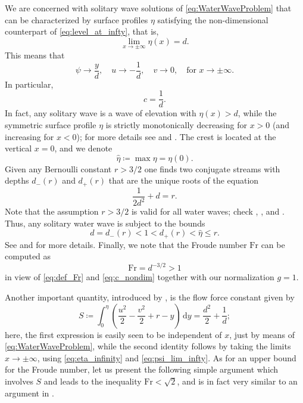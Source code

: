 \documentclass{amsart}
\theoremstyle{definition}
\newcommand{\dd}{\mathrm d}
\newcommand{\Fr}{\textrm{Fr}}
\begin{document}
We are concerned with solitary wave solutions of \eqref{eq:WaterWaveProblem} that can be characterized by surface profiles $\eta$ satisfying the non-dimensional counterpart of \eqref{eq:level_at_infty}, that is,
\begin{equation}\label{eq:eta_infinity}
	\lim_{x\to\pm\infty}\eta(x)=d.
\end{equation}
This means that
\begin{equation}\label{eq:psi_lim_infty}
	\psi\to\frac yd,\quad u\to-\frac1d,\quad v\to 0,\quad \textrm{for }x\to\pm\infty.
\end{equation}
In particular,
\begin{equation}\label{eq:c_nondim}
	c=\frac1d.
\end{equation}
In fact, any solitary wave is a wave of elevation with $\eta(x) > d$, while the symmetric surface profile $\eta$ is strictly monotonically decreasing for $x > 0$ (and increasing for $x<0$); for more details see \cite{CraigSternberg88} and \cite{KozlovLokharuWheeler21}. The crest is located at the vertical $x = 0$, and we denote
\[\hat\eta \coloneqq \max \eta = \eta(0).\]
Given any Bernoulli constant $r > 3/2$ one finds two conjugate streams with depths $d_-(r)$ and $d_+(r)$ that are the unique roots of the equation
\begin{equation}\label{eq:d}
	\frac{1}{2d^2} + d = r.
\end{equation}
Note that the assumption $r > 3/2$ is valid for all water waves; check \cite{AmickToland81b}, \cite{KeadyNorbury75}, and \cite{Kozlov2009-xp}. Thus, any solitary water wave is subject to the bounds
\begin{equation}\label{eq:hateta_interval}
	d = d_-(r) < 1 < d_+(r) < \hat{\eta} \leq r.
\end{equation}
See \cite{KeadyNorbury75} and \cite{Kozlov2009-xp} for more details. Finally, we note that the Froude number $\Fr$ can be computed as
\begin{equation}\label{eq:Fr_nondim}
	\Fr = d^{-3/2} > 1
\end{equation}
in view of \eqref{eq:def_Fr} and \eqref{eq:c_nondim} together with our normalization $g=1$.

Another important quantity, introduced by \cite{Benjamin1954-bl}, is the flow force constant given by
\begin{equation}\label{ff}
	S \coloneqq \int_0^\eta\left(\frac{u^2}{2}-\frac{v^2}{2}+r-y\right)\,\dd y = \frac{d^2}{2} + \frac{1}{d};
\end{equation}
here, the first expression is easily seen to be independent of $x$, just by means of \eqref{eq:WaterWaveProblem}, while the second identity follows by taking the limits $x\to\pm\infty$, using \eqref{eq:eta_infinity} and \eqref{eq:psi_lim_infty}. As for an upper bound for the Froude number, let us present the following simple argument which involves $S$ and leads to the inequality $\Fr < \sqrt{2}$, and is in fact very similar to an argument in \cite{kp}.
\end{document}
